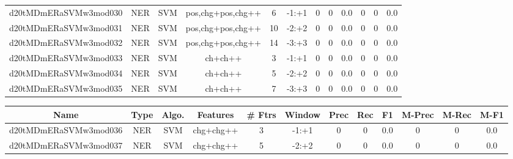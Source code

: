 \documentclass[a4paper]{article}
\begin{document}
\begin{landscape}
\begin{center}
\begin{tabular}{ |c|c|c|c|c|c|c|c|c|c|c|c|}
 
 	
 	\small{ d20tMDmERaSVMw3mod030 } & \small{ NER} & \small{  SVM }  & pos,chg+pos,chg++  &  6 &  \small{  -1:+1 }  &  0 & 0 & 0.0  &  0 & 0 & 0.0 \\
 	

 
 	
 	\small{ d20tMDmERaSVMw3mod031 } & \small{ NER} & \small{  SVM }  & pos,chg+pos,chg++  &  10 &  \small{  -2:+2 }  &  0 & 0 & 0.0  &  0 & 0 & 0.0 \\
 	

 
 	
 	\small{ d20tMDmERaSVMw3mod032 } & \small{ NER} & \small{  SVM }  & pos,chg+pos,chg++  &  14 &  \small{  -3:+3 }  &  0 & 0 & 0.0  &  0 & 0 & 0.0 \\
 	

 
 	
 	\small{ d20tMDmERaSVMw3mod033 } & \small{ NER} & \small{  SVM }  & ch+ch++  &  3 &  \small{  -1:+1 }  &  0 & 0 & 0.0  &  0 & 0 & 0.0 \\
 	

 
 	
 	\small{ d20tMDmERaSVMw3mod034 } & \small{ NER} & \small{  SVM }  & ch+ch++  &  5 &  \small{  -2:+2 }  &  0 & 0 & 0.0  &  0 & 0 & 0.0 \\
 	

 
 	
 	\small{ d20tMDmERaSVMw3mod035 } & \small{ NER} & \small{  SVM }  & ch+ch++  &  7 &  \small{  -3:+3 }  &  0 & 0 & 0.0  &  0 & 0 & 0.0 \\
 	
 \hline
\end{tabular}
\end{center}




\begin{center}
\begin{tabular}{ |c|c|c|c|c|c|c|c|c|c|c|c|} 
 \hline
 	Name & Type & Algo. & Features & \# Ftrs & Window & Prec & Rec & F1 & M-Prec & M-Rec & M-F1\\
 \hline

 	

 
 	
 	\small{ d20tMDmERaSVMw3mod036 } & \small{ NER} & \small{  SVM }  & chg+chg++  &  3 &  \small{  -1:+1 }  &  0 & 0 & 0.0  &  0 & 0 & 0.0 \\
 	

 
 	
 	\small{ d20tMDmERaSVMw3mod037 } & \small{ NER} & \small{  SVM }  & chg+chg++  &  5 &  \small{  -2:+2 }  &  0 & 0 & 0.0  &  0 & 0 & 0.0 \\
 	


\end{tabular}
\end{center}
\end{landscape}
\end{document}
